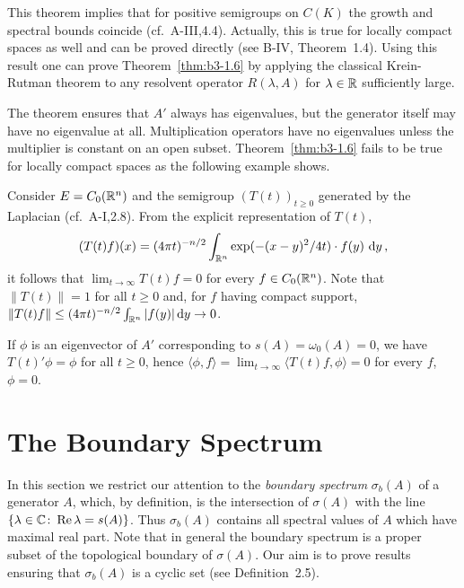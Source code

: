 This theorem implies that for positive semigroups on $C(K)$ the growth and spectral bounds coincide (cf.\ A-III,4.4).
Actually, this is true for locally compact spaces as well and can be proved directly (see B-IV, Theorem~1.4).
Using this result one can prove Theorem~\ref{thm:b3-1.6} by applying the classical Krein-Rutman theorem to any resolvent operator $R(\lambda,A)$ for $\lambda \in \mathbb{R}$ sufficiently large.

The theorem ensures that $A'$ always has eigenvalues, but the generator itself may have no eigenvalue at all.
Multiplication operators have no eigenvalues unless the multiplier is constant on an open subset.
Theorem~\ref{thm:b3-1.6} fails to be true for locally compact spaces as the following example shows.
\begin{example}\label{ex:b3-1.7}
	Consider $E = C_{0}(\mathbb{R}^{n})$ and the semigroup $(T(t))_{t \geq 0}$ generated by the Laplacian (cf.\ A-I,2.8).
From the explicit representation of $T(t)$,
	\begin{equation}\label{eq:b3-1.17}
		(T(t)f)(x) = (4\pi t)^{-n/2}\int_{\mathbb{R}^{n}} \exp(-(x-y)^{2}/4t)\cdot f(y) \, \mathop{}\!\mathrm{d}{y} \,,
	\end{equation}
	it follows that $\lim_{t \to \infty}T(t)f = 0$ for every $f \in C_{0}(\mathbb{R}^{n})$. Note that $\|T(t)\| = 1$ for all $t \geq 0$ and, for $f$ having compact support,      
    $\|T(t)f\| \leq (4\pi t)^{-n/2}\int_{\mathbb{R}^{n}} |f(y)| \mathop{}\!\mathrm{d}{y} \to 0$. 
    	
	If $\phi$ is an eigenvector of $A'$ corresponding to $s(A) = \omega_{0}(A) = 0$, we have $T(t)'\phi = \phi$ for all $t \geq 0$, hence $\langle \phi,f \rangle = \lim_{t \to \infty}\langle T(t)f,\phi \rangle = 0$ for every $f$, \ie $\phi = 0$.
\end{example}
\section{The Boundary Spectrum}\label{sec:b3-2}%
In this section we restrict our attention to the \emph{boundary spectrum} $\sigma_{b}(A)$ of a generator $A$, which, by definition, is the intersection of $\sigma(A)$ with the line $\{\lambda \in \mathbb{C} \colon \mathop{}\!\mathrm{Re}\,\lambda = s(A)\}$.
Thus $\sigma_{b}(A)$ contains all spectral values of $A$ which have maximal real part.
Note that in general the boundary spectrum is a proper subset of the topological boundary of $\sigma(A)$.
Our aim is to prove results ensuring that $\sigma_{b}(A)$ is a cyclic set (see Definition~2.5).

